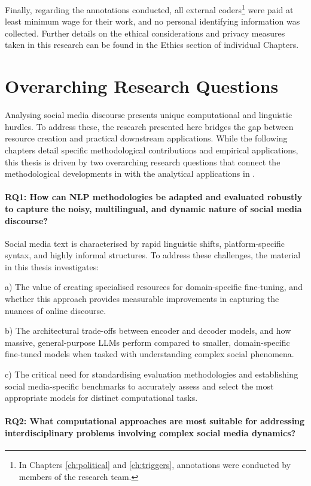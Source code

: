 Finally, regarding the annotations conducted, all external coders\footnote{In Chapters \ref{ch:political} and \ref{ch:triggers}, annotations were conducted by members of the research team.} were paid at least minimum wage for their work, and no personal identifying information was collected. Further details on the ethical considerations and privacy measures taken in this research can be found in the Ethics section of individual Chapters.


\section{Overarching Research Questions}\label{ch1:new-rq}
Analysing social media discourse presents unique computational and linguistic hurdles. To address these, the research presented here bridges the gap between resource creation and practical downstream applications. While the following chapters detail specific methodological contributions and empirical applications, this thesis is driven by two overarching research questions that connect the methodological developments in  with the analytical applications in .  

\paragraph{RQ1: How can \ac{NLP} methodologies be adapted and evaluated robustly to capture the noisy, multilingual, and dynamic nature of social media discourse?}

Social media text is characterised by rapid linguistic shifts, platform-specific syntax, and highly informal structures. To address these challenges, the material in this thesis investigates:

a) The value of creating specialised resources for domain-specific fine-tuning, and whether this approach provides measurable improvements in capturing the nuances of online discourse.

b) The architectural trade-offs between encoder and decoder models, and how massive, general-purpose \acp{LLM} perform compared to smaller, domain-specific fine-tuned models when tasked with understanding complex social phenomena.

c) The critical need for standardising evaluation methodologies and establishing social media-specific benchmarks to accurately assess and select the most appropriate models for distinct computational tasks.

\paragraph{RQ2: What computational approaches are most suitable for addressing interdisciplinary problems involving complex social media dynamics?}

